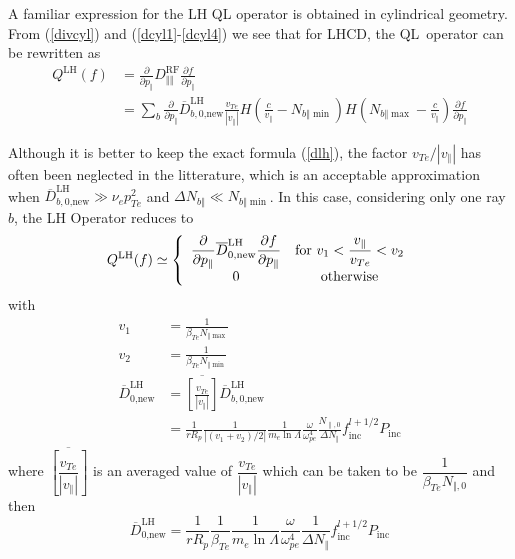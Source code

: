 A familiar expression for the LH QL operator is obtained in cylindrical
geometry. From (\ref{divcyl}) and (\ref{dcyl1}-\ref{dcyl4}) we see that for
LHCD, the QL\ operator can be rewritten as
\begin{align}
Q^{\text{LH}}(f)  &  =\frac{\partial}{\partial p_{\Vert}}D_{\Vert\Vert
}^{\text{RF}}\frac{\partial f}{\partial p_{\Vert}}\nonumber\\
&  =\sum_{b}\frac{\partial}{\partial p_{\Vert}}\overline{D}_{b,0\text{,new}%
}^{\text{LH}}\frac{v_{Te}}{\left|  v_{\Vert}\right|  }H\left(  \frac
{c}{v_{\Vert}}-N_{b\Vert\min}\right)  H\left(  N_{b\Vert\max}-\frac
{c}{v_{\Vert}}\right)  \frac{\partial f}{\partial p_{\Vert}} \label{dlh}%
\end{align}

Although it is better to keep the exact formula (\ref{dlh}), the factor
$v_{Te}/\left|  v_{\Vert}\right|  $ has often been neglected in the
litterature, which is an acceptable approximation when $\overline
{D}_{b,0\text{,new}}^{\text{LH}}\gg\nu_{e}p_{Te}^{2}$ and $\Delta N_{b\Vert
}\ll N_{b\Vert\min}$. In this case, considering only one ray $b$, the LH
Operator reduces to
\begin{equation}
Q^{\text{LH}}(f)\simeq\left\{
\begin{array}
[c]{cc}%
\dfrac{\partial}{\partial p_{\Vert}}\overline{D}_{0\text{,new}}^{\text{LH}%
}\dfrac{\partial f}{\partial p_{\Vert}} & \text{for }v_{1}<\dfrac{v_{\Vert}%
}{v_{Te}}<v_{2}\\
0 & \text{otherwise}%
\end{array}
\right.
\end{equation}
with
\begin{align}
v_{1}  &  =\frac{1}{\beta_{Te}N_{\Vert\max}}\\
v_{2}  &  =\frac{1}{\beta_{Te}N_{\Vert\min}}\\
\overline{D}_{0\text{,new}}^{\text{LH}}  &  =\overline{\left[  \frac{v_{Te}%
}{\left|  v_{\Vert}\right|  }\right]  }\overline{D}_{b,0\text{,new}%
}^{\text{LH}}\\
&  =\frac{1}{rR_{p}}\frac{1}{\left|  \left(  v_{1}+v_{2}\right)  /2\right|
}\frac{1}{m_{e}\ln\Lambda}\frac{\omega}{\omega_{pe}^{4}}\frac{N_{\parallel,0}%
}{\Delta N_{\Vert}}f_{\text{inc}}^{l+1/2}P_{\text{inc}}%
\end{align}
where $\overline{\left[  \dfrac{v_{Te}}{\left|  v_{\Vert}\right|  }\right]  }$
is an averaged value of $\dfrac{v_{Te}}{\left|  v_{\Vert}\right|  }$ which can
be taken to be $\dfrac{1}{\beta_{Te}N_{\Vert,0}}$ and then%
\begin{equation}
\overline{D}_{0\text{,new}}^{\text{LH}}=\frac{1}{rR_{p}}\frac{1}{\beta_{Te}%
}\frac{1}{m_{e}\ln\Lambda}\frac{\omega}{\omega_{pe}^{4}}\frac{1}{\Delta
N_{\Vert}}f_{\text{inc}}^{l+1/2}P_{\text{inc}}%
\end{equation}

